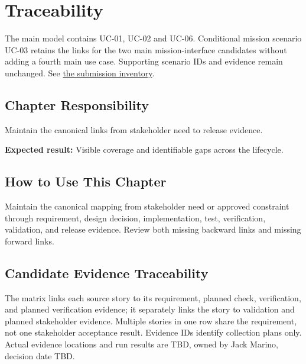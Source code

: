 \chapter{Traceability}
The main model contains UC-01, UC-02 and UC-06. Conditional mission scenario
UC-03 retains the links for the two main mission-interface candidates without
adding a fourth main use case. Supporting scenario IDs and evidence remain
unchanged. See \hyperref[Section:SubmissionPackage]{the submission inventory}.
\section{Chapter Responsibility}
\label{Section:TraceabilityResponsibility}
Maintain the canonical links from stakeholder need to release evidence.

\noindent\textbf{Expected result:} Visible coverage and identifiable gaps across the lifecycle.

\section{How to Use This Chapter}
Maintain the canonical mapping from stakeholder need or approved constraint through requirement, design decision, implementation, test, verification, validation, and release evidence. Review both missing backward links and missing forward links.
\section{Candidate Evidence Traceability}
The matrix links each source story to its requirement, planned check,
verification, and planned verification evidence; it separately links the
story to validation and planned stakeholder evidence. Multiple stories in one
row share the requirement, not one stakeholder acceptance result. Evidence
IDs identify collection plans only. Actual evidence locations and run results
are TBD, owned by Jack Marino, decision date TBD.

